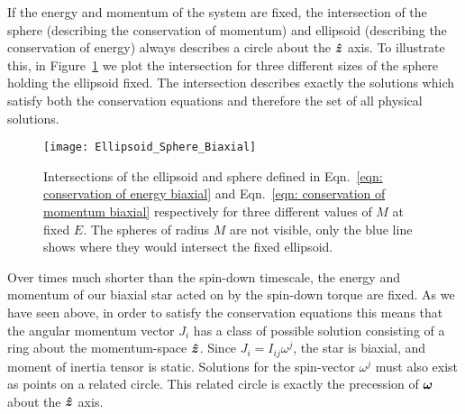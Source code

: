 \documentclass[../full_thesis/full_thesis.tex]{subfiles}
\begin{document}
If the energy and momentum of the system are fixed, the intersection of the
sphere (describing the conservation of momentum) and ellipsoid (describing the
conservation of energy) always describes a circle about the $\boldsymbol{\hat{z}}$ axis. To illustrate
this, in Figure~\ref{fig: plot sphere ellipse biaxial} we plot the intersection
for three different sizes of the sphere holding the ellipsoid fixed. The
intersection describes exactly the solutions which satisfy both the conservation
equations and therefore the set of all physical solutions.
\begin{figure}[ht]
\centering
\texttt{[image: Ellipsoid\_Sphere\_Biaxial]}
\caption{Intersections of the ellipsoid and sphere defined in Eqn.~\eqref{eqn:
conservation of energy biaxial} and Eqn.~\eqref{eqn: conservation of momentum
biaxial} respectively for three different values of $M$ at
fixed $E$. The spheres of radius $M$ are not visible, only the blue line shows
where they would intersect the fixed ellipsoid.}
\label{fig: plot sphere ellipse biaxial}
\end{figure}

Over times much shorter than the spin-down timescale, the energy and momentum
of our biaxial star acted on by the spin-down torque are fixed. As we have seen
above, in order to satisfy the conservation equations this means that the
angular momentum vector $J_i$ has a class of possible solution consisting of a
ring about the momentum-space $\boldsymbol{\hat{z}}$.  Since $J_{i}=I_{ij}\omega^{j}$, the star
is biaxial, and moment of inertia tensor is static. Solutions for the spin-vector $\omega^j$
must also exist as points on a related circle. This related circle is exactly
the precession of $\boldsymbol{\omega}$ about the $\boldsymbol{\hat{z}}$ axis.
\end{document}
